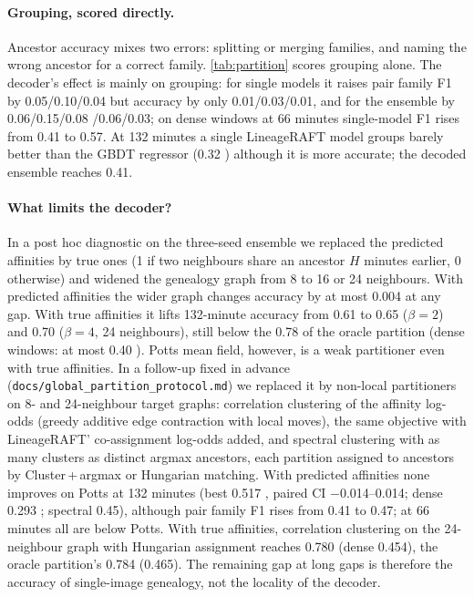 \documentclass[10pt,twocolumn,letterpaper]{article}
\newcommand{\ours}{LineageRAFT\xspace}
\begin{document}
\paragraph{Grouping, scored directly.}
Ancestor accuracy mixes two errors: splitting or merging families, and naming the wrong ancestor for a correct family. \cref{tab:partition} scores grouping alone. The decoder's effect is mainly on grouping: for single models it raises pair family F1 by 0.05/0.10/0.04 but accuracy by only 0.01/0.03/0.01, and for the ensemble by 0.06/0.15/0.08 /0.06/0.03; on dense windows at 66 minutes single-model F1 rises from 0.41 to 0.57. At 132 minutes a single \ours model groups barely better than the GBDT regressor (0.32 ) although it is more accurate; the decoded ensemble reaches 0.41.


\paragraph{What limits the decoder?}
In a post hoc diagnostic on the three-seed ensemble we replaced the predicted affinities by true ones (1 if two neighbours share an ancestor $H$ minutes earlier, 0 otherwise) and widened the genealogy graph from 8 to 16 or 24 neighbours. With predicted affinities the wider graph changes accuracy by at most 0.004 at any gap. With true affinities it lifts 132-minute accuracy from 0.61 to 0.65 ($\beta{=}2$) and 0.70 ($\beta{=}4$, 24 neighbours), still below the 0.78 of the oracle partition (dense windows: at most 0.40 ). Potts mean field, however, is a weak partitioner even with true affinities. In a follow-up fixed in advance (\texttt{docs/global\_partition\_protocol.md}) we replaced it by non-local partitioners on 8- and 24-neighbour target graphs: correlation clustering of the affinity log-odds (greedy additive edge contraction with local moves), the same objective with \ours' co-assignment log-odds added, and spectral clustering with as many clusters as distinct argmax ancestors, each partition assigned to ancestors by Cluster\,+\,argmax or Hungarian matching. With predicted affinities none improves on Potts at 132 minutes (best 0.517 , paired CI $-$0.014--0.014; dense 0.293 ; spectral 0.45), although pair family F1 rises from 0.41 to 0.47; at 66 minutes all are below Potts. With true affinities, correlation clustering on the 24-neighbour graph with Hungarian assignment reaches 0.780 (dense 0.454), the oracle partition's 0.784 (0.465). The remaining gap at long gaps is therefore the accuracy of single-image genealogy, not the locality of the decoder.
\end{document}
